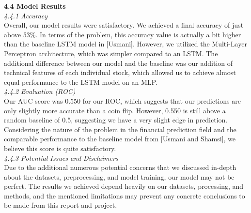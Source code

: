 \documentclass[letterpaper,12pt, twocolumn]{report}
\begin{document}
\noindent
\textbf{4.4 Model Results}\\
\textit{4.4.1 Accuracy}\\
Overall, our model results were satisfactory. We achieved a final accuracy of just above 53\%. In terms of the problem, this accuracy value is actually a bit higher than the baseline LSTM model in [Usmani]. However, we utilized the Multi-Layer Perceptron architecture, which was simpler compared to an LSTM. The additional difference between our model and the baseline was our addition of technical features of each individual stock, which allowed us to achieve almost equal performance to the LSTM model on an MLP.\\

\noindent
\textit{4.4.2 Evaluation (ROC)}\\
Our AUC score was 0.550 for our ROC, which suggests that our predictions are only slightly more accurate than a coin flip. However, 0.550 is still above a random baseline of 0.5, suggesting we have a very slight edge in prediction. Considering the nature of the problem in the financial prediction field and the comparable performance to the baseline model from [Usmani and Shamsi], we believe this score is quite satisfactory. \\

\noindent
\textit{4.4.3 Potential Issues and Disclaimers}\\
Due to the additional numerous potential concerns that we discussed in-depth about the datasets, preprocessing, and model training, our model may not be perfect. The results we achieved depend heavily on our datasets, processing, and methods, and the mentioned limitations may prevent any concrete conclusions to be made from this report and project.\\
\end{document}
